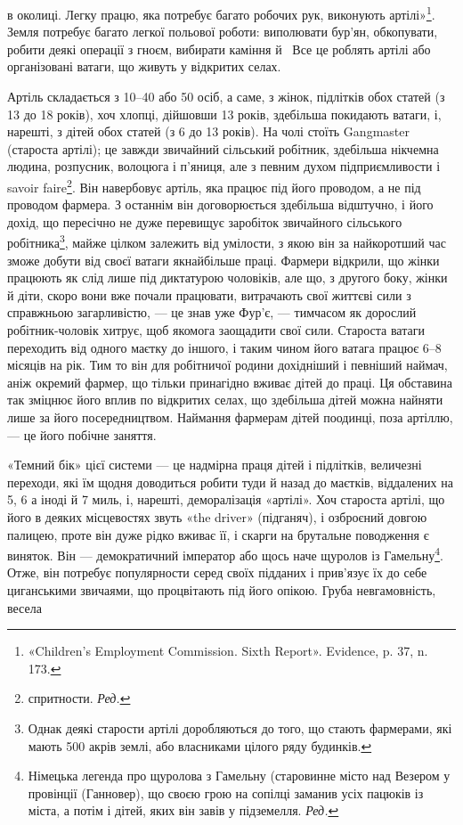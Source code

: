 \parcont{}  %
в околиці. Легку працю, яка потребує багато робочих рук, виконують
артілі»\footnote{
«Children's Employment Commission. Sixth Report». Evidence,
p. 37, n. 173.
}. Земля потребує багато легкої польової роботи:
виполювати бур’ян, обкопувати, робити деякі операції з
гноєм, вибирати каміння й~ Все це роблять артілі або організовані
ватаги, що живуть у відкритих селах.

Артіль складається з 10--40 або 50 осіб, а саме, з жінок,
підлітків обох статей (з 13 до 18 років), хоч хлопці, дійшовши
13 років, здебільша покидають ватаги, і, нарешті, з дітей обох
статей (з 6 до 13 років). На чолі стоїть Gangmaster (староста
артілі); це завжди звичайний сільський робітник, здебільша
нікчемна людина, розпусник, волоцюга і п’яниця, але з певним
духом підприємливости і savoir faire\footnote*{
спритности. \emph{Ред.}
}. Він навербовує артіль,
яка працює під його проводом, а не під проводом фармера. З останнім
він договорюється здебільша відштучно, і його дохід, що
пересічно не дуже перевищує заробіток звичайного сільського
робітника\footnote{
Однак деякі старости артілі доробляються до того, що стають
фармерами, які мають 500 акрів землі, або власниками цілого ряду будинків.
}, майже цілком залежить від умілости, з якою він
за найкоротший час зможе добути від своєї ватаги якнайбільше
праці. Фармери відкрили, що жінки працюють як слід лише під
диктатурою чоловіків, але що, з другого боку, жінки й діти,
скоро вони вже почали працювати, витрачають свої життєві
сили з справжньою загарливістю, — це знав уже Фур’є, — тимчасом
як дорослий робітник-чоловік хитрує, щоб якомога заощадити
свої сили. Староста ватаги переходить від одного маєтку
до іншого, і таким чином його ватага працює 6--8 місяців на
рік. Тим то він для робітничої родини дохідніший і певніший
наймач, аніж окремий фармер, що тільки принагідно вживає
дітей до праці. Ця обставина так зміцнює його вплив по відкритих
селах, що здебільша дітей можна найняти лише за його посередництвом.
Наймання фармерам дітей поодинці, поза артіллю, —
це його побічне заняття.

«Темний бік» цієї системи — це надмірна праця дітей і підлітків,
величезні переходи, які їм щодня доводиться робити туди
й назад до маєтків, віддалених на 5, 6 а іноді й 7 миль, і, нарешті,
деморалізація «артілі». Хоч староста артілі, що його в деяких
місцевостях звуть «the driver» (підганяч), і озброєний довгою
палицею, проте він дуже рідко вживає її, і скарги на брутальне
поводження є виняток. Він — демократичний імператор або щось
наче щуролов із Гамельну\footnote*{
Німецька легенда про щуролова з Гамельну (старовинне місто
над Везером у провінції (Ганновер), що своєю грою на сопілці заманив
усіх пацюків із міста, а потім і дітей, яких він завів у підземелля. \emph{Ред.}
}. Отже, він потребує популярности
серед своїх підданих і прив’язує їх до себе циганськими звичаями,
що процвітають під його опікою. Груба невгамовність, весела
\parbreak{}  %

